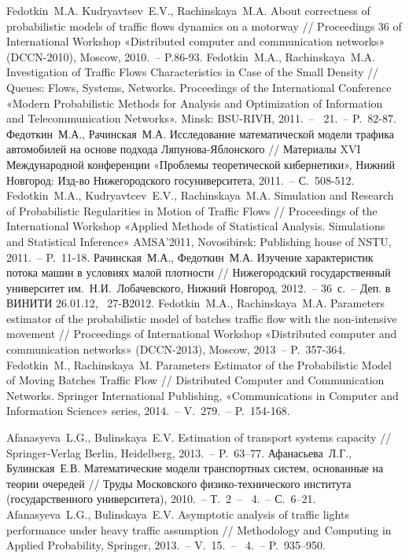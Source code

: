 \documentclass[a4paper,12pt,russian]{extarticle}
\newcommand{\No}{\textnumero}
\begin{document}
\begin{thebibliography}{99}
 Fedotkin~M.A. Kudryavtsev~E.V., Rachinskaya~M.A.  About correctness of probabilistic models of traffic flows dynamics on a motorway // Proceedings 36 of International Workshop «Distributed computer and communication networks» (DCCN-2010), Moscow, 2010.~-- P.86-93.
 Fedotkin~M.A., Rachinskaya~M.A. Investigation of Traffic Flows Characteristics in Case of the Small Density // Queues: Flows, Systems, Networks. Proceedings of the International Conference «Modern Probabilistic Methods for Analysis and Optimization of Information and Telecommunication Networks». Minsk: BSU-RIVH, 2011.~-- \No{}~21.~-- P.~82-87.
 Федоткин~М.А., Рачинская~М.А. Исследование математической модели трафика автомобилей на основе подхода Ляпунова-Яблонского // Материалы XVI Международной конференции «Проблемы теоретической кибернетики», Нижний Новгород: Изд-во Нижегородского госуниверситета, 2011.~-- С.~508-512.
 Fedotkin~M.A., Kudryavtcev~E.V., Rachinskaya~M.A. Simulation and Research of Probabilistic Regularities in Motion of Traffic Flows // Proceedings of the International Workshop «Applied Methods of Statistical Analysis. Simulations and
Statistical Inference» AMSA’2011, Novosibirsk: Publishing house of NSTU, 2011.~-- P.~11-18.
 Рачинская~М.А., Федоткин~М.А. Изучение характеристик потока машин в условиях малой плотности // Нижегородский государственный университет им.~Н.И.~Лобачевского, Нижний Новгород, 2012.~-- 36~с.~-- Деп. в ВИНИТИ 26.01.12, \No{}~27-В2012.
 Fedotkin~M.A., Rachinskaya~M.A. Parameters estimator of the probabilistic model of batches traffic flow with the non-intensive movement // Proceedings of International Workshop «Distributed computer and communication networks» (DCCN-2013), Moscow, 2013~-- P.~357-364.
 Fedotkin~M., Rachinskaya~M. Parameters Estimator of the Probabilistic Model of Moving Batches Traffic Flow // Distributed Computer and Communication Networks. Springer International Publishing, «Communications in Computer and Information Science» series, 2014.~-- V.~279.~-- P.~154-168.

 Afanasyeva~L.G., Bulinskaya~E.V. Estimation of transport systems capacity // Springer-Verlag Berlin, Heidelberg, 2013.~-- P.~63–77.
 Афанасьева~Л.Г., Булинская~Е.В. Математические модели транспортных систем, основанные на теории очередей // Труды Московского физико-технического института (государственного университета), 2010.~-- Т.~2~-- \No{}~4.~-- С.~6–21.
 Afanasyeva~L.G., Bulinskaya~E.V. Asymptotic analysis of traffic lights performance under heavy traffic assumption // Methodology and Computing in Applied Probability, Springer, 2013.~-- V.~15.~-- \No{}~4.~-- P.~935–950.


\end{thebibliography}
\end{document}
